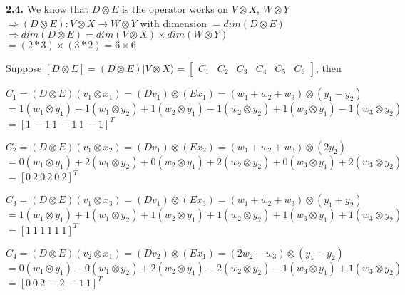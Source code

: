 \documentclass [12pt]{article}
\theoremstyle{definition}
\newcommand{\ket}[1]{| {#1} \rangle}
\begin{document}
\phantom{1em} {\bf 2.4.} We know that $D \otimes E$ is the operator works on $V \otimes X$, $W \otimes Y$\\
\phantom{1000em} $\Rightarrow (D \otimes E) : V \otimes X \rightarrow W \otimes Y$ with dimension $= dim(D \otimes E)$\\
\phantom{1000em} $\Rightarrow dim(D \otimes E) = dim(V \otimes X) \times dim(W \otimes Y)$\\ 
\phantom{1000em} $= (2*3) \times (3*2) = 6 \times 6$

\phantom{1000em} Suppose $[D \otimes E] = (D \otimes E)\ket{V \otimes X}= \begin{bmatrix} C_{1} & C_{2} & C_{3} & C_{4} & C_{5} & C_{6} \end{bmatrix}$, then

\phantom{1000em} $C_{1} = (D \otimes E)(v_{1} \otimes x_{1}) = (Dv_{1}) \otimes (Ex_{1}) = (w_{1}+w_{2}+w_{3}) \otimes (y_{1}-y_{2})$\\
\phantom{1000em} $= 1(w_{1} \otimes y_{1}) -1(w_{1} \otimes y_{2}) +1(w_{2} \otimes y_{1}) -1(w_{2} \otimes y_{2}) +1(w_{3} \otimes y_{1}) -1(w_{3} \otimes y_{2})$\\
\phantom{1000em} $= [1 \ -1 \ 1 \ -1 \ 1 \ -1]^{T}$

\phantom{1000em} $C_{2} = (D \otimes E)(v_{1} \otimes x_{2}) = (Dv_{1}) \otimes (Ex_{2}) = (w_{1}+w_{2}+w_{3}) \otimes (2y_{2})$\\
\phantom{1000em} $= 0(w_{1} \otimes y_{1}) +2(w_{1} \otimes y_{2}) +0(w_{2} \otimes y_{1}) +2(w_{2} \otimes y_{2}) +0(w_{3} \otimes y_{1}) +2(w_{3} \otimes y_{2})$\\
\phantom{1000em} $= [0 \ 2 \ 0 \ 2 \ 0 \ 2]^{T}$

\phantom{1000em} $C_{3} = (D \otimes E)(v_{1} \otimes x_{3}) = (Dv_{1}) \otimes (Ex_{3}) = (w_{1}+w_{2}+w_{3}) \otimes (y_{1}+y_{2})$\\
\phantom{1000em} $= 1(w_{1} \otimes y_{1}) +1(w_{1} \otimes y_{2}) +1(w_{2} \otimes y_{1}) +1(w_{2} \otimes y_{2}) +1(w_{3} \otimes y_{1}) +1(w_{3} \otimes y_{2})$\\
\phantom{1000em} $= [1 \ 1 \ 1 \ 1 \ 1 \ 1]^{T}$

\phantom{1000em} $C_{4} = (D \otimes E)(v_{2} \otimes x_{1}) = (Dv_{2}) \otimes (Ex_{1}) = (2w_{2}-w_{3}) \otimes (y_{1}-y_{2})$\\
\phantom{1000em} $= 0(w_{1} \otimes y_{1}) -0(w_{1} \otimes y_{2}) +2(w_{2} \otimes y_{1}) -2(w_{2} \otimes y_{2}) -1(w_{3} \otimes y_{1}) +1(w_{3} \otimes y_{2})$\\
\phantom{1000em} $= [0 \ 0 \ 2 \ -2 \ -1 \ 1]^{T}$
\end{document}
